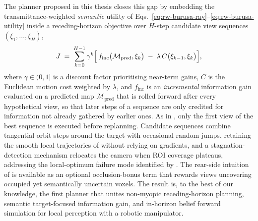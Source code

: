 The planner proposed in this thesis closes this gap by embedding the
transmittance-weighted \emph{semantic} utility of
Eqs.~\ref{eq:rw-burusa-ray}--\ref{eq:rw-burusa-utility} inside a
receding-horizon objective over $H$-step candidate view sequences
$(\xi_1,\dots,\xi_H)$,
%
\begin{equation}
  J \;=\; \sum_{k=0}^{H-1} \gamma^{k}
  \Bigl[\, f_{\mathrm{inc}}\bigl(\mathcal{M}_{\mathrm{pred}}, \xi_k\bigr)
  \;-\; \lambda\, C\bigl(\xi_{k-1}, \xi_k\bigr) \Bigr],
  \label{eq:rw-ours}
\end{equation}
%
where $\gamma \in (0,1]$ is a discount factor prioritising near-term
gains, $C$ is the Euclidean motion cost weighted by $\lambda$, and
$f_{\mathrm{inc}}$ is an \emph{incremental} information gain evaluated
on a predicted map $\mathcal{M}_{\mathrm{pred}}$ that is rolled forward
after every hypothetical view, so that later steps of a sequence are
only credited for information not already gathered by earlier ones. As
in \textcite{bircher2016}, only the first view of the best sequence is
executed before replanning. Candidate sequences combine tangential
orbit steps around the target with occasional random jumps, retaining
the smooth local trajectories of \textcite{burusa2024} without relying
on gradients, and a stagnation-detection mechanism relocates the camera
when ROI coverage plateaus, addressing the local-optimum failure mode
identified by \textcite{verlinden2024pso}. The rear-side intuition of
\textcite{delmerico2018} is available as an optional occlusion-bonus
term that rewards views uncovering occupied yet semantically uncertain
voxels. The result is, to the best of our knowledge, the first planner
that unites non-myopic receding-horizon planning, semantic
target-focused information gain, and in-horizon belief forward
simulation for local perception with a robotic manipulator.
